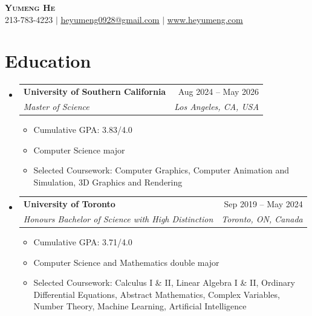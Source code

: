 \documentclass[letterpaper,11pt]{article}
\newcommand{\resumeItem}[1]{
  \item\small{
    {#1 
    }
  }
}
\newcommand{\resumeSubheading}[4]{
  \ifFirstSubheading
    \global\FirstSubheadingfalse
  \else
    \addvspace{4pt}
  \fi
  \item
    \begin{tabularx}{\textwidth}[t]{X r}
      \textbf{#1} & #2 \\
      \textit{\small#3} & \textit{\small #4} \\
    \end{tabularx}
}
\newif\ifFirstSubheading
\newcommand{\resumeSubHeadingListStart}{\global\FirstSubheadingtrue\begin{itemize}[leftmargin=0in, label={}]}
\newcommand{\resumeSubHeadingListEnd}{\end{itemize}}
\newcommand{\resumeItemListStart}{\begin{itemize}}
\newcommand{\resumeItemListEnd}{\end{itemize}}
\begin{document}

\begin{center}
    \textbf{\Huge \scshape Yumeng He} \\ \vspace{1pt}
    \small 213-783-4223 $|$ \href{mailto:heyumeng0928@gmail.com}{\underline{heyumeng0928@gmail.com}} $|$ 
    \href{https://www.heyumeng.com} 
    {\underline{www.heyumeng.com}}
\end{center}


\section{Education}
  \resumeSubHeadingListStart
    \resumeSubheading{University of Southern California}{Aug 2024 -- May 2026}{Master of Science}{Los Angeles, CA, USA}
    \resumeItemListStart
      \resumeItem{Cumulative GPA: 3.83/4.0}
      \resumeItem{Computer Science major}
      \resumeItem{Selected Coursework: Computer Graphics, Computer Animation and Simulation, 3D Graphics and Rendering}
    \resumeItemListEnd
    \resumeSubheading{University of Toronto}{Sep 2019 -- May 2024}{Honours Bachelor of Science with High Distinction}{Toronto, ON, Canada}
    \resumeItemListStart
      \resumeItem{Cumulative GPA: 3.71/4.0}
      \resumeItem{Computer Science and Mathematics double major}
      \resumeItem{Selected Coursework: Calculus I \& II, Linear Algebra I \& II, Ordinary Differential Equations, Abstract Mathematics, Complex Variables, Number Theory, Machine Learning, Artificial Intelligence}
    \resumeItemListEnd
  \resumeSubHeadingListEnd
\end{document}
